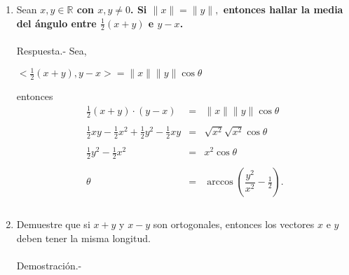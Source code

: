 \begin{enumerate}

    \item Sean \textbf{\boldmath $x,y \in \mathbb{R}$ con $x,y\neq 0$. Si $\|x\|=\|y\|,$ entonces hallar la media del ángulo entre $\frac{1}{2}(x+y)$ e $y-x$.}\\\\
	Respuesta.-\; Sea,
	\begin{center}
	$<\frac{1}{2}(x+y),y-x>=\|x\|\|y\|\cos \theta$
	\end{center}
	entonces 
	$$\begin{array}{rcl}
	    \frac{1}{2}(x+y)\cdot (y-x) &=& \|x\|\|y\|\cos \theta \\\\
	    \frac{1}{2}xy-\frac{1}{2}x^2+\frac{1}{2}y^2-\frac{1}{2}xy &=& \sqrt{x^2}\sqrt{x^2}\cos \theta\\\\
		\frac{1}{2}y^2-\frac{1}{2}x^2&=&x^2\cos \theta\\\\
		\theta&=&\arccos\left(\dfrac{y^2}{x^2}-\frac{1}{2}\right).\\\\
	\end{array}$$
	\vspace{.7cm}

    \item Demuestre que si $x+y$ y $x-y$ son ortogonales, entonces los vectores $x$ e $y$ deben tener la misma longitud.\\\\
	Demostración.-\; 

\end{enumerate}
